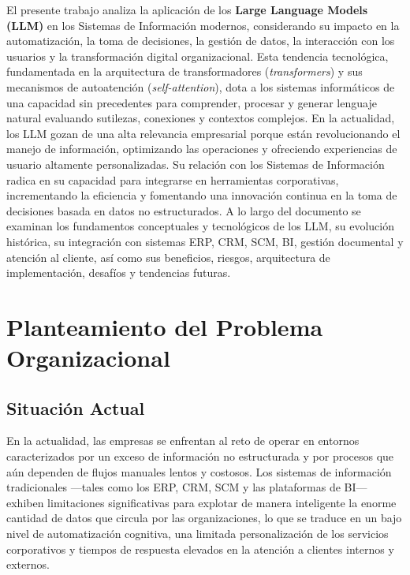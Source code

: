 \documentclass[12pt,a4paper,oneside]{article}
\begin{document}
El presente trabajo analiza la aplicación de los \textbf{Large Language Models (LLM)} en los Sistemas de Información modernos, considerando su impacto en la automatización, la toma de decisiones, la gestión de datos, la interacción con los usuarios y la transformación digital organizacional. Esta tendencia tecnológica, fundamentada en la arquitectura de transformadores (\textit{transformers}) y sus mecanismos de autoatención (\textit{self-attention}), dota a los sistemas informáticos de una capacidad sin precedentes para comprender, procesar y generar lenguaje natural evaluando sutilezas, conexiones y contextos complejos. En la actualidad, los LLM gozan de una alta relevancia empresarial porque están revolucionando el manejo de información, optimizando las operaciones y ofreciendo experiencias de usuario altamente personalizadas. Su relación con los Sistemas de Información radica en su capacidad para integrarse en herramientas corporativas, incrementando la eficiencia y fomentando una innovación continua en la toma de decisiones basada en datos no estructurados. A lo largo del documento se examinan los fundamentos conceptuales y tecnológicos de los LLM, su evolución histórica, su integración con sistemas ERP, CRM, SCM, BI, gestión documental y atención al cliente, así como sus beneficios, riesgos, arquitectura de implementación, desafíos y tendencias futuras.

\section{Planteamiento del Problema Organizacional}

\subsection{Situación Actual}

En la actualidad, las empresas se enfrentan al reto de operar en entornos caracterizados por un exceso de información no estructurada y por procesos que aún dependen de flujos manuales lentos y costosos. Los sistemas de información tradicionales ---tales como los ERP, CRM, SCM y las plataformas de BI--- exhiben limitaciones significativas para explotar de manera inteligente la enorme cantidad de datos que circula por las organizaciones, lo que se traduce en un bajo nivel de automatización cognitiva, una limitada personalización de los servicios corporativos y tiempos de respuesta elevados en la atención a clientes internos y externos.
\end{document}
